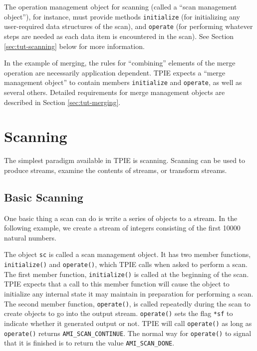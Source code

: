The operation management object for scanning (called a ``scan
management object''), for
instance, must provide methods \lstinline|initialize| (for
initializing any user-required data structures of the scan), and
\lstinline|operate| (for performing whatever steps are needed as each
data item is encountered in the scan). See Section
\ref{sec:tut-scanning} below for more information.

In the example of merging, the rules for ``combining'' elements of the
merge operation are necessarily application dependent. TPIE expects a
``merge management object''
to contain members \lstinline|initialize| and \lstinline|operate|, as
well as several others. Detailed requirements for merge management
objects are described in Section \ref{sec:tut-merging}.

\section{Scanning}

 
The simplest paradigm available in TPIE is scanning.  Scanning can be
used to produce streams, examine the contents of streams, or transform
streams.  

\subsection{Basic Scanning}

One basic thing a scan can do is write a series of
objects to a stream.  In the following example, we create a
stream of integers consisting of the first 10000 natural
numbers.  



The object \lstinline|sc| is called a scan management
object.  It has two
member functions, \lstinline|initialize()| and
\lstinline|operate()|, which TPIE calls when asked to perform a
scan.  The first member function, \lstinline|initialize()| is
called at the beginning of the scan.  TPIE expects that a
call to this member function will cause the object to
initialize any internal state it may maintain in preparation
for performing a scan.  The second member function,
\lstinline|operate()|, is called repeatedly during the scan to
create objects to go into the output stream.
\lstinline|operate()| sets the flag \lstinline|*sf| to indicate
whether it generated output or not.  TPIE will call
\lstinline|operate()| as long as \lstinline|operate()| returns
\lstinline|AMI_SCAN_CONTINUE|. The normal way for
\lstinline|operate()| to signal that it is finished is to
return the value \lstinline|AMI_SCAN_DONE|. 

